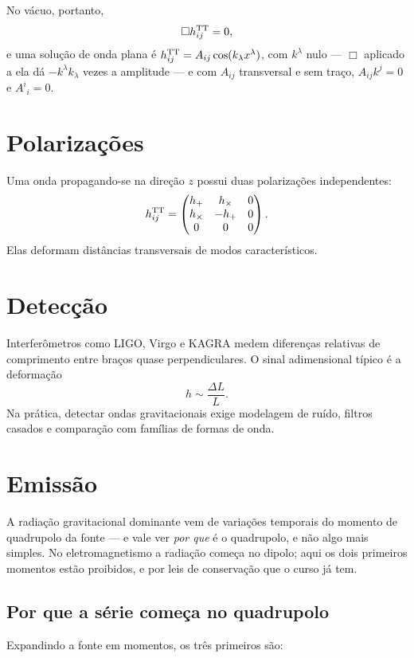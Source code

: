 \documentclass[12pt,a4paper,oneside]{book}
\theoremstyle{rgplain}
\theoremstyle{rgremark}
\begin{document}
No vácuo, portanto,
\begin{equation}
  \Box h^{\rm TT}_{ij}=0 ,
  \label{eq:onda-tt}
\end{equation}
e uma solução de onda plana é
$h^{\rm TT}_{ij}=A_{ij}\cos(k_\lambda x^\lambda)$, com $k^\lambda$ nulo ---
$\Box$ aplicado a ela dá $-k^\lambda k_\lambda$ vezes a amplitude --- e com
$A_{ij}$ transversal e sem traço, $A_{ij}k^j=0$ e $A^i{}_i=0$.

\section{Polarizações}

Uma onda propagando-se na direção $z$ possui duas polarizações independentes:
\[
  h^{\rm TT}_{ij}=
  \begin{pmatrix}
  h_+ & h_\times & 0\\
  h_\times & -h_+ & 0\\
  0&0&0
  \end{pmatrix}.
\]
Elas deformam distâncias transversais de modos característicos.

\section{Detecção}

Interferômetros como LIGO, Virgo e KAGRA medem diferenças relativas de
comprimento entre braços quase perpendiculares. O sinal adimensional típico é
a deformação
\[
  h\sim\frac{\Delta L}{L}.
\]
Na prática, detectar ondas gravitacionais exige modelagem de ruído, filtros
casados e comparação com famílias de formas de onda.

\section{Emissão}
\label{sec:emissao-ondas}

A radiação gravitacional dominante vem de variações temporais do momento de
quadrupolo da fonte --- e vale ver \emph{por que} é o quadrupolo, e não algo
mais simples. No eletromagnetismo a radiação começa no dipolo; aqui os dois
primeiros momentos estão proibidos, e por leis de conservação que o curso já
tem.

\subsection*{Por que a série começa no quadrupolo}

Expandindo a fonte em momentos, os três primeiros são:
\end{document}
